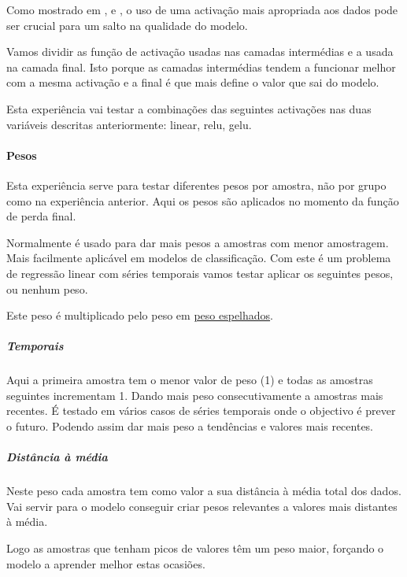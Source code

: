 Como mostrado em \cite{Vaswani2017}, e \cite{Liu2022}, o uso de uma activação mais apropriada aos dados pode ser crucial para um salto na qualidade do modelo.\par
Vamos dividir as função de activação usadas nas camadas intermédias e a usada na camada final. Isto porque as camadas intermédias tendem a funcionar melhor com a mesma activação e a final é que mais define o valor que sai do modelo.\par
Esta experiência vai testar a combinações das seguintes activações nas duas variáveis descritas anteriormente: linear, relu, gelu.\par


\paragraph{Pesos}
\text{ }  \par

Esta experiência serve para testar diferentes pesos por amostra, não por grupo como na experiência anterior. Aqui os pesos são aplicados no momento da função de perda final.\par
Normalmente é usado para dar mais pesos a amostras com menor amostragem. Mais facilmente aplicável em modelos de classificação. Com este é um problema de regressão linear com séries temporais vamos testar aplicar os seguintes pesos, ou nenhum peso.\par
Este peso é multiplicado pelo peso em \hyperref[se:advancedloss]{peso espelhados}.


\subparagraph{Temporais}
\text{ }  \par
Aqui a primeira amostra tem o menor valor de peso (1) e todas as amostras seguintes incrementam 1. Dando mais peso consecutivamente a amostras mais recentes. É testado em vários casos de séries temporais onde o objectivo é prever o futuro. Podendo assim dar mais peso a tendências e valores mais recentes.\par

\subparagraph{Distância à média}
\text{ }  \par
Neste peso cada amostra tem como valor a sua distância à média total dos dados. Vai servir para o modelo conseguir criar pesos relevantes a valores mais distantes à média.\par
Logo as amostras que tenham picos de valores têm um peso maior, forçando o modelo a aprender melhor estas ocasiões.

